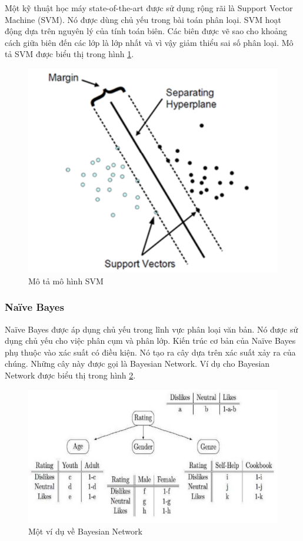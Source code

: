 Một kỹ thuật học máy state-of-the-art được sử dụng rộng rãi là Support Vector Machine (SVM). Nó được dùng chủ yếu trong bài toán phân loại. SVM hoạt động dựa trên nguyên lý của tính toán biên. Các biên được vẽ sao cho khoảng cách giữa biên đến các lớp là lớp nhất và vì vậy giảm thiểu sai số phân loại. Mô tả SVM được biểu thị trong hình \ref{fig:svm-overview}.

\begin{figure}[ht!]
	\centering
	\includegraphics[width=0.5\linewidth]{fig/svm-overview.png}
	\caption{Mô tả mô hình SVM \cite{18-Dey}}
	\label{fig:svm-overview}
\end{figure}

\subsubsection{Naïve Bayes}

Naïve Bayes được áp dụng chủ yếu trong lĩnh vực phân loại văn bản. Nó được sử dụng chủ yếu cho việc phân cụm và phân lớp. Kiến trúc cơ bản của Naïve Bayes phụ thuộc vào xác suất có điều kiện. Nó tạo ra cây dựa trên xác suất xảy ra của chúng. Những cây này được gọi là Bayesian Network. Ví dụ cho Bayesian Network được biểu thị trong hình \ref{fig:naive-bayes-example}.

\begin{figure}[ht!]
	\centering
	\includegraphics[width=0.75\linewidth]{fig/naive-bayes-example.png}
	\caption{Một ví dụ về Bayesian Network \cite{18-Dey}}
	\label{fig:naive-bayes-example}
\end{figure}

